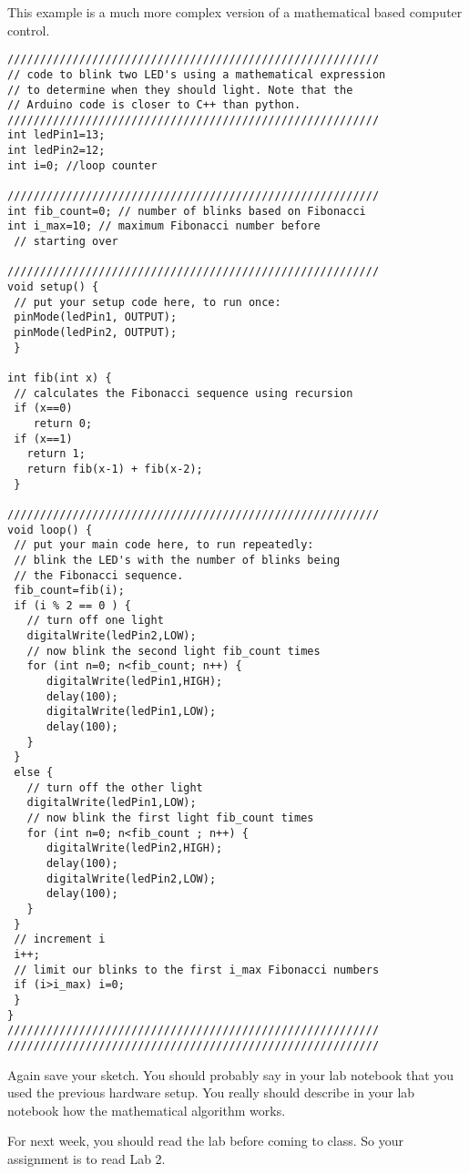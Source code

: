 This example is a much more complex version of a mathematical based computer
control.
 \begin{lstlisting}[language=Arduino]
/////////////////////////////////////////////////////////
// code to blink two LED's using a mathematical expression
// to determine when they should light. Note that the
// Arduino code is closer to C++ than python.
/////////////////////////////////////////////////////////
int ledPin1=13;
int ledPin2=12;
int i=0; //loop counter
 
/////////////////////////////////////////////////////////
int fib_count=0; // number of blinks based on Fibonacci
int i_max=10; // maximum Fibonacci number before 
 // starting over
 
/////////////////////////////////////////////////////////
void setup() {
 // put your setup code here, to run once:
 pinMode(ledPin1, OUTPUT);
 pinMode(ledPin2, OUTPUT);
 } 
 
int fib(int x) {
 // calculates the Fibonacci sequence using recursion
 if (x==0) 
    return 0;
 if (x==1)
   return 1;
   return fib(x-1) + fib(x-2);
 } 
 
/////////////////////////////////////////////////////////
void loop() {
 // put your main code here, to run repeatedly:
 // blink the LED's with the number of blinks being 
 // the Fibonacci sequence.
 fib_count=fib(i);
 if (i % 2 == 0 ) {
   // turn off one light
   digitalWrite(ledPin2,LOW);
   // now blink the second light fib_count times 
   for (int n=0; n<fib_count; n++) { 
      digitalWrite(ledPin1,HIGH);
      delay(100);
      digitalWrite(ledPin1,LOW);
      delay(100);
   }
 }
 else {
   // turn off the other light
   digitalWrite(ledPin1,LOW);
   // now blink the first light fib_count times
   for (int n=0; n<fib_count ; n++) { 
      digitalWrite(ledPin2,HIGH);
      delay(100);
      digitalWrite(ledPin2,LOW);
      delay(100);
   }
 }
 // increment i
 i++;
 // limit our blinks to the first i_max Fibonacci numbers
 if (i>i_max) i=0;
 }
}
/////////////////////////////////////////////////////////
/////////////////////////////////////////////////////////
 \end{lstlisting}

Again save your sketch. You should probably say in your lab notebook that
you used the previous hardware setup. You really should describe in your lab
notebook how the mathematical algorithm works.

For next week, you should read the lab before coming to class. So your
assignment is to read Lab 2.

\vspace*{\fill}%
\pagebreak
